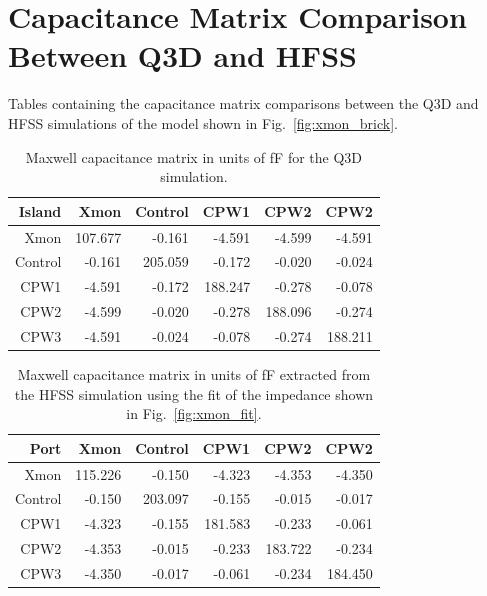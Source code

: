 \newpage
\section{Capacitance Matrix Comparison Between Q3D and HFSS}\label{appendix:q3d_vs_hfss}

Tables containing the capacitance matrix comparisons between the Q3D and HFSS simulations of the model shown in Fig.\ \ref{fig:xmon_brick}.

\renewcommand{\arraystretch}{1.5}
\begin{table}[h!]
    \centering
    \begin{tabular}{|r|r|r|r|r|r|}
    \hline
    Island  & Xmon    & Control & CPW1    & CPW2    & CPW2    \\ \hline
    Xmon    & 107.677 & -0.161  & -4.591  & -4.599  & -4.591  \\ \hline
    Control & -0.161  & 205.059 & -0.172  & -0.020  & -0.024  \\ \hline
    CPW1    & -4.591  & -0.172  & 188.247 & -0.278  & -0.078  \\ \hline
    CPW2    & -4.599  & -0.020  & -0.278  & 188.096 & -0.274  \\ \hline
    CPW3    & -4.591  & -0.024  & -0.078  & -0.274  & 188.211 \\ \hline
    \end{tabular}
    \caption{Maxwell capacitance matrix in units of fF for the Q3D simulation.}
\end{table}

\begin{table}[h!]
    \centering
    \begin{tabular}{|r|r|r|r|r|r|}
    \hline
    Port    & Xmon    & Control & CPW1    & CPW2    & CPW2    \\ \hline
    Xmon    & 115.226 & -0.150  & -4.323  & -4.353  & -4.350  \\ \hline
    Control & -0.150  & 203.097 & -0.155  & -0.015  & -0.017  \\ \hline
    CPW1    & -4.323  & -0.155  & 181.583 & -0.233  & -0.061  \\ \hline
    CPW2    & -4.353  & -0.015  & -0.233  & 183.722 & -0.234  \\ \hline
    CPW3    & -4.350  & -0.017  & -0.061  & -0.234  & 184.450 \\ \hline
    \end{tabular}
    \caption{Maxwell capacitance matrix in units of fF extracted from the HFSS simulation using the fit of the impedance shown in Fig.\ \ref{fig:xmon_fit}.}
\end{table}


